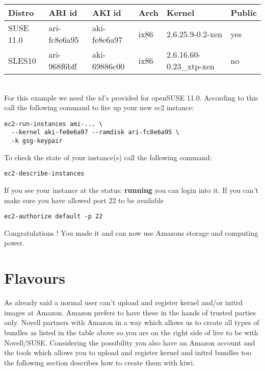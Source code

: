 \begin{tabular}[h]{|p{2cm}|p{2.6cm}|p{2.6cm}|p{1cm}|p{4cm}|p{1.5cm}|}
\hline
\textbf{Distro} & \textbf{ARI id} & \textbf{AKI id} & \textbf{Arch} &
\textbf{Kernel} & \textbf{Public} \\
\hline
SUSE 11.0 & ari-fc8e6a95 & aki-fe8e6a97 & ix86 & 2.6.25.9-0.2-xen & yes\\
SLES10    & ari-968f6bff & aki-69886c00 & ix86 & 2.6.16.60-0.23\_xtp-xen & no\\
\hline
\end{tabular}\\

For this example we need the id's provided for openSUSE 11.0. According
to this call the following command to fire up your new ec2 instance:

\begin{Command}{13cm}
\begin{verbatim}
ec2-run-instances ami-... \
  --kernel aki-fe8e6a97 --ramdisk ari-fc8e6a95 \
  -k gsg-keypair
\end{verbatim}
\end{Command}

To check the state of your instance(s) call the following command:

\begin{Command}{10cm}
\begin{verbatim}
ec2-describe-instances
\end{verbatim}
\end{Command}

If you see your instance at the status: \textbf{running} you can login
into it. If you can't make sure you have allowed port 22 to be available

\begin{Command}{10cm}
\begin{verbatim}
ec2-authorize default -p 22
\end{verbatim}
\end{Command}

Congratulations ! You made it and can now use Amazons storage and
computing power.

\section{Flavours}

As already said a normal user can't upload and register kernel and/or
initrd images at Amazon. Amazon prefers to have these in the hands of
trusted parties only. Novell partners with Amazon in a way which allows
us to create all types of bundles as listed in the table above so you
are on the right side of live to be with Novell/SUSE. Considering the
possibility you also have an Amazon account and the tools which allows
you to upload and register kernel and initrd bundles too the following
section describes how to create them with kiwi.

